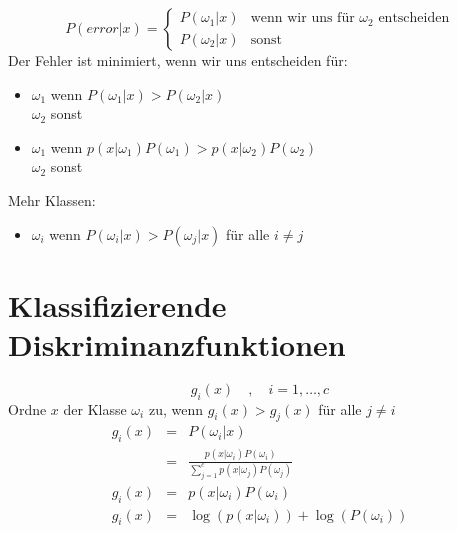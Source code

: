 $$P(error | x) = \left\{ \begin{array}{cl} P(\omega_1 | x) & \textrm{wenn wir uns für } \omega_2 \textrm{ entscheiden} \\ P(\omega_2 | x) & \textrm{sonst} \end{array} \right.$$
Der Fehler ist minimiert, wenn wir uns entscheiden für:
\begin{itemize}
\item $\omega_1$ wenn $P(\omega_1 | x) > P(\omega_2 | x)$ \\ $\omega_2$ sonst
\item $\omega_1$ wenn $p(x | \omega_1)P(\omega_1) > p(x | \omega_2)P(\omega_2)$ \\ $\omega_2$ sonst
\end{itemize}
Mehr Klassen:
\begin{itemize}
\item $\omega_i$ wenn $P(\omega_i | x) > P(\omega_j | x)$ für alle $i \not= j$
\end{itemize}

\section{Klassifizierende Diskriminanzfunktionen}

$$g_i(x) \quad , \quad i = 1, \dots, c$$
Ordne $x$ der Klasse $\omega_i$ zu, wenn $g_i(x) > g_j(x)$ für alle $j \not= i$
\begin{eqnarray*}
g_i(x) &=& P(\omega_i | x) \\ &=& \frac{p(x | \omega_i) P(\omega_i)}{\sum\limits_{j=1}^c p(x | \omega_j)P(\omega_j)} \\ g_i(x) &=& p(x | \omega_i) P(\omega_i) \\
g_i(x) &=& \log(p(x | \omega_i)) + \log(P(\omega_i))
\end{eqnarray*}

